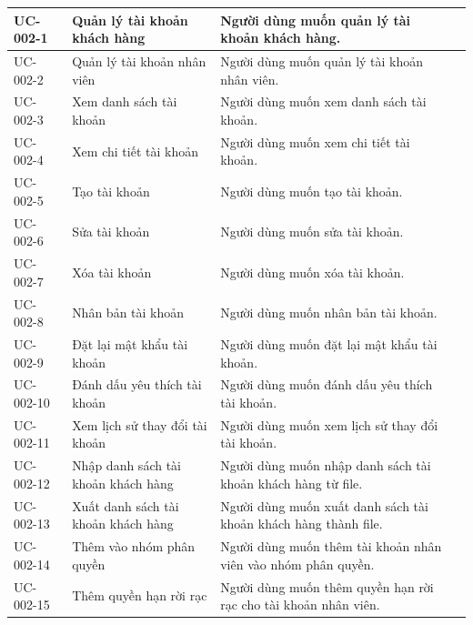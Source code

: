 \documentclass[12pt,a4paper]{article}
\begin{document}
\begin{center}
\begin{longtable}{|p{2.5cm}|p{4.5cm}|p{7.5cm}|c|}
            UC-002-1
            & Quản lý tài khoản khách hàng
            & Người dùng muốn quản lý tài khoản khách hàng.
            \\ \hline
            UC-002-2
            & Quản lý tài khoản nhân viên
            & Người dùng muốn quản lý tài khoản nhân viên.
            \\ \hline
            UC-002-3
            & Xem danh sách tài khoản
            & Người dùng muốn xem danh sách tài khoản.
            \\ \hline
            UC-002-4
            & Xem chi tiết tài khoản
            & Người dùng muốn xem chi tiết tài khoản.
            \\ \hline
            UC-002-5
            & Tạo tài khoản
            & Người dùng muốn tạo tài khoản.
            \\ \hline
            UC-002-6
            & Sửa tài khoản
            & Người dùng muốn sửa tài khoản.
            \\ \hline
            UC-002-7
            & Xóa tài khoản
            & Người dùng muốn xóa tài khoản.
            \\ \hline
            UC-002-8
            & Nhân bản tài khoản
            & Người dùng muốn nhân bản tài khoản.
            \\ \hline
            UC-002-9
            & Đặt lại mật khẩu tài khoản
            & Người dùng muốn đặt lại mật khẩu tài khoản.
            \\ \hline
            UC-002-10
            & Đánh dấu yêu thích tài khoản
            & Người dùng muốn đánh dấu yêu thích tài khoản.
            \\ \hline
            UC-002-11
            & Xem lịch sử thay đổi tài khoản
            & Người dùng muốn xem lịch sử thay đổi tài khoản.
            \\ \hline
            UC-002-12
            & Nhập danh sách tài khoản khách hàng
            & Người dùng muốn nhập danh sách tài khoản khách hàng từ file.
            \\ \hline
            UC-002-13
            & Xuất danh sách tài khoản khách hàng
            & Người dùng muốn xuất danh sách tài khoản khách hàng thành file.
            \\ \hline
            UC-002-14
            & Thêm vào nhóm phân quyền
            & Người dùng muốn thêm tài khoản nhân viên vào nhóm phân quyền.
            \\ \hline
            UC-002-15
            & Thêm quyền hạn rời rạc
            & Người dùng muốn thêm quyền hạn rời rạc cho tài khoản nhân viên.

\end{longtable}
\end{center}
\end{document}
